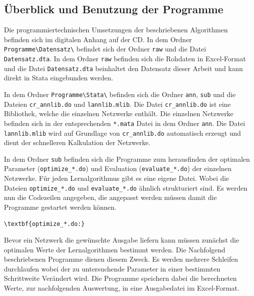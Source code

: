 %        


\newpage
\subsection{Überblick und Benutzung der Programme}\label{sec:program}

Die programmiertechnischen Umsetzungen der beschriebenen Algorithmen befinden sich im digitalen Anhang auf der CD. In dem Ordner \verb|Programme\Datensatz\| befindet sich der Ordner \verb|raw| und die Datei \verb|Datensatz.dta|. In dem Ordner \verb|raw| befinden sich die Rohdaten in Excel-Format und die Datei \verb|Datensatz.dta| beinhaltet den Datensatz dieser Arbeit und kann direkt in Stata eingebunden werden.

In dem Ordner \verb|Programme\Stata\| befinden sich die Ordner \verb|ann|, \verb|sub| und die Dateien \verb|cr_annlib.do| und \verb|lannlib.mlib|. Die Datei \verb|cr_annlib.do| ist eine Bibliothek, welche die einzelnen Netzwerke enthält. Die einzelnen Netzwerke befinden sich in der entsprechenden \verb|*.mata| Datei in dem Ordner \verb|ann|. Die Datei \verb|lannlib.mlib| wird auf Grundlage von \verb|cr_annlib.do| automatisch erzeugt und dient der schnelleren Kalkulation der Netzwerke.

In dem Ordner \verb|sub| befinden sich die Programme zum herausfinden der optimalen Parameter (\verb|optimize_*.do|) und Evaluation (\verb|evaluate_*.do|) der einzelnen Netzwerke.
Für jeden Lernalgorithmus gibt es eine eigene Datei. Wobei die Dateien \verb|optimize_*.do| und \verb|evaluate_*.do| ähnlich strukturiert sind. 
Es werden nun die Codezeilen angegeben, die angepasst werden müssen damit die Programme gestartet werden können.\\

\begin{Verbatim}[commandchars=\\\{\}]
\textbf{optimize_*.do:}
\end{Verbatim}
Bevor ein Netzwerk die gewünschte Ausgabe liefern kann müssen zunächst die optimalen Werte der Lernalgorithmen bestimmt werden. Die Nachfolgend beschriebenen Programme dienen diesem Zweck. Es werden mehrere Schleifen durchlaufen wobei der zu untersuchende Parameter in einer bestimmten Schrittweite Verändert wird. Die Programme speichern dabei die berechneten Werte, zur nachfolgenden Auswertung, in eine Ausgabedatei im Excel-Format.


